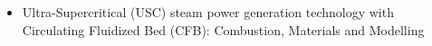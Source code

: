 \documentclass[letterpaper]{article}
\begin{document}
\begin{itemize}
\begin{itemize}
		\item	Ultra-Supercritical (USC) steam power generation technology with Circulating Fluidized Bed (CFB): Combustion, Materials and Modelling
		\end{itemize}


\end{itemize}
\end{document}
